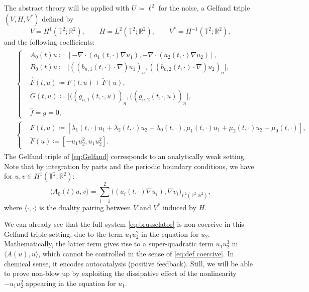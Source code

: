 \documentclass{amsart}
\newcommand{\<}{\langle}
\newcommand{\?}{\rangle}
\newcommand{\ceqq}{\coloneqq}
\newcommand{\Tor}{\mathbb{T}}
\renewcommand{\Tor}{\mathbb{T}^2}
\theoremstyle{plain}
\theoremstyle{remark}
\theoremstyle{plain}
\numberwithin{equation}{section}
\def\R{{\mathbb R}}
\begin{document}
The abstract theory will be applied with   
  $U\ceqq \ell^2$ for the noise,  a Gelfand triple $(V,H,V^*)$ defined by 
\begin{equation}\label{eq:Gelfand}
    V=H^1(\Tor;\R^2),\qquad H= L^2(\Tor;\R^2), \qquad V^*= H^{-1}(\Tor;\R^2),
\end{equation} 
and the following coefficients:   
\begin{align}\label{eq: defs coeff}
\begin{split}
&\begin{cases}
 &A_0(t)u\ceqq[-\nabla\cdot(a_1(t,\cdot)\nabla u_1), -\nabla\cdot(a_2(t,\cdot)\nabla u_2)],\\[.2em]
 &B_0(t)u\ceqq\big[((b_{n,1}(t,\cdot)\cdot\nabla)u_1)_n, ((b_{n,2}(t,\cdot)\cdot\nabla)u_2)_n\big],\\[.2em]
 &\hat{F}(t,u)\ceqq F(t,u)+\breve{F}(u), \\[.2em]
 &G(t,u) \ceqq\big[((g_{n,1}(t,\cdot,u))_n, ((g_{n,2}(t,\cdot,u))_n\big],\\[.2em]
& \hat{f}=g=0,
\end{cases}\\& 
\begin{cases}
  &F(t,u) \ceqq[\lambda_1(t,\cdot)u_1+\lambda_2(t,\cdot)u_2
 +\lambda_0(t,\cdot),\mu_1(t,\cdot)u_1+\mu_2(t,\cdot)u_2+\mu_0(t,\cdot)],\\ 
 &\breve{F}(u) \ceqq [-u_1u_2^2, u_1u_2^2].
\end{cases}
\end{split}
\end{align}
The Gelfand triple of \eqref{eq:Gelfand} corresponds to an analytically weak setting. Note that by integration by parts and the periodic boundary conditions, we have for $u,v\in H^1(\Tor;\R^2)$:
\begin{equation}
\langle A_0(t)u,v\rangle 
=\textstyle{\sum_{i=1}^2 }\big(  (a_i(t,\cdot)\nabla u_i),\nabla v_i\big)_{L^2(\Tor;\R^2)},  
\end{equation}
where $\<\cdot,\cdot\?$ is the duality pairing between $V$ and $V^*$ induced by $H$. 

We can already see that the full system \eqref{eq:brusselator} is non-coercive in this Gelfand triple setting, due to the term $u_1u_2^2$  in the equation for $u_2$.  
Mathematically, the latter term gives rise to a super-quadratic term $u_1u_2^3$ in $\<A(u),u\?$, which cannot be controlled in the sense of \eqref{eq:def coercive}. In chemical sense, it encodes autocatalysis (positive feedback). 
Still, we will be able to prove non-blow up by exploiting the dissipative effect of the nonlinearity $-u_1u_2^2$ appearing in the equation for $u_1$.  
\end{document}
